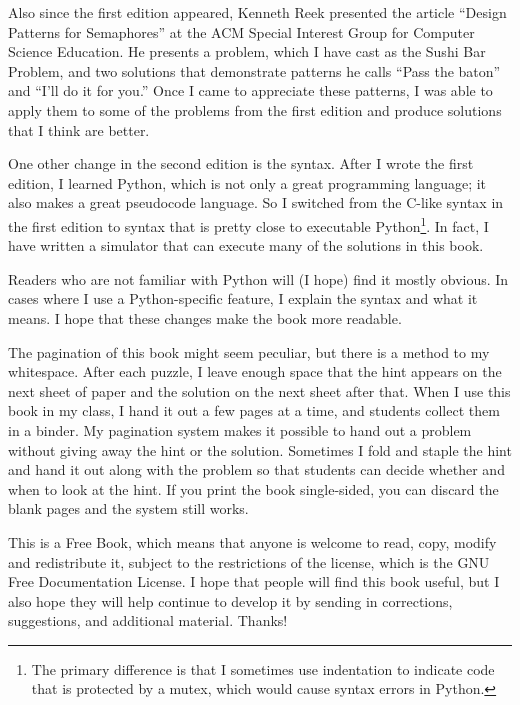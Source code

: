 \documentclass{book}
\begin{document}
Also since the first edition appeared, Kenneth Reek presented the
article ``Design Patterns for Semaphores'' at the ACM Special Interest
Group for Computer Science Education.  He presents a problem, which
I have cast as the Sushi Bar Problem, and two solutions that demonstrate
patterns he calls ``Pass the baton'' and ``I'll do it for you.''
Once I came to appreciate these patterns, I was able to apply them
to some of the problems from the first edition and produce solutions
that I think are better.

One other change in the second edition is the syntax.  After I wrote
the first edition, I learned Python, which is not only a great
programming language; it also makes a great pseudocode language.  So I
switched from the C-like syntax in the first edition to syntax
that is pretty close to executable Python\footnote{The primary
difference is that I sometimes use indentation to indicate code that
is protected by a mutex, which would cause syntax errors in Python.}.
In fact, I have written a simulator that can execute many of the
solutions in this book.

Readers who are not familiar with Python will (I hope) find it mostly
obvious.  In cases where I use a Python-specific feature, I explain the
syntax and what it means.  I hope that these changes make the book
more readable.

The pagination of this book might seem peculiar, but there is a method
to my whitespace.  After each puzzle, I leave enough space that the
hint appears on the next sheet of paper and the solution on the next
sheet after that.  When I use this book in my class, I hand it out a
few pages at a time, and students collect them in a binder.  My
pagination system makes it possible to hand out a problem without
giving away the hint or the solution.  Sometimes I fold and staple the
hint and hand it out along with the problem so that students can
decide whether and when to look at the hint.  If you print the book
single-sided, you can discard the blank pages and the system still
works.

This is a Free Book, which means that anyone is welcome to read,
copy, modify and redistribute it, subject to the restrictions of the
license, which is the GNU Free Documentation License.  I hope that people
will find this book useful, but I also hope they will help continue
to develop it by sending in corrections, suggestions, and additional
material.  Thanks!

\vspace{0.3in}
\end{document}
